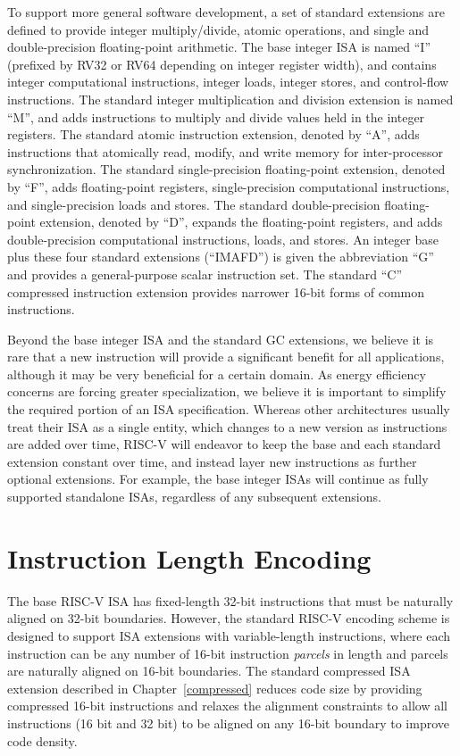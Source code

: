To support more general software development, a set of standard
extensions are defined to provide integer multiply/divide, atomic
operations, and single and double-precision floating-point arithmetic.
The base integer ISA is named ``I'' (prefixed by RV32 or RV64
depending on integer register width), and contains integer
computational instructions, integer loads, integer stores, and
control-flow instructions.  The standard integer multiplication and
division extension is named ``M'', and adds instructions to multiply
and divide values held in the integer registers.  The standard atomic
instruction extension, denoted by ``A'', adds instructions that
atomically read, modify, and write memory for inter-processor
synchronization.  The standard single-precision floating-point
extension, denoted by ``F'', adds floating-point registers,
single-precision computational instructions, and single-precision
loads and stores.  The standard double-precision floating-point
extension, denoted by ``D'', expands the floating-point registers, and
adds double-precision computational instructions, loads, and stores.
An integer base plus these four standard extensions (``IMAFD'') is
given the abbreviation ``G'' and provides a general-purpose scalar
instruction set.  The standard ``C'' compressed instruction extension
provides narrower 16-bit forms of common instructions.

Beyond the base integer ISA and the standard GC extensions, we believe
it is rare that a new instruction will provide a significant benefit
for all applications, although it may be very beneficial for a certain
domain.  As energy efficiency concerns are forcing greater
specialization, we believe it is important to simplify the required
portion of an ISA specification.  Whereas other architectures usually
treat their ISA as a single entity, which changes to a new version as
instructions are added over time, RISC-V will endeavor to keep the
base and each standard extension constant over time, and instead layer
new instructions as further optional extensions.  For example, the
base integer ISAs will continue as fully supported standalone ISAs,
regardless of any subsequent extensions.

\section{Instruction Length Encoding}

The base RISC-V ISA has fixed-length 32-bit instructions that must be
naturally aligned on 32-bit boundaries.  However, the standard RISC-V
encoding scheme is designed to support ISA extensions with
variable-length instructions, where each instruction can be any number
of 16-bit instruction {\em parcels} in length and parcels are
naturally aligned on 16-bit boundaries.  The standard compressed ISA
extension described in Chapter~\ref{compressed} reduces code size by
providing compressed 16-bit instructions and relaxes the alignment
constraints to allow all instructions (16 bit and 32 bit) to be
aligned on any 16-bit boundary to improve code density.

